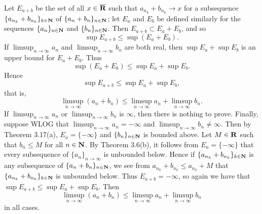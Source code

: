 \begin{ex}
Let $E_{a+b}$ be the set of all $x \in \overline{\mathbf{R}}$ such that $a_{n_k} + b_{n_k} \to x$ for a subsequence $\{a_{n_k} + b_{n_k}\}_{k \in \mathbf{N}}$ of $\{a_n + b_n\}_{n \in \mathbf{N}}$; let $E_a$ and $E_b$ be defined similarly for the sequences $\{a_n\}_{n \in \mathbf{N}}$ and $\{b_n\}_{n \in \mathbf{N}}$. Then $E_{a+b} \subset E_a + E_b$, and so \[\sup E_{a + b} \leq \sup(E_a + E_b).\] If $\limsup_{n\to\infty}a_n$ and $\limsup_{n\to\infty}b_n$ are both real, then $\sup E_a + \sup E_b$ is an upper bound for $E_a + E_b$. Thus\[\sup(E_a + E_b) \leq \sup E_a + \sup E_b.\] Hence \[\sup E_{a+b} \leq \sup E_a + \sup E_b,\] that is, \[\limsup_{n\to\infty}(a_n+b_n) \leq \limsup_{n\to\infty}a_n + \limsup_{n\to\infty}b_n.\] If $\limsup_{n\to\infty}a_n$ or $\limsup_{n\to\infty}b_n$ is $\infty$, then there is nothing to prove. Finally, suppose WLOG that $\limsup_{n\to\infty}a_n = -\infty$ and $\limsup_{n\to\infty}b_n \not = \infty$. Then by Theorem 3.17(a), $E_a = \{-\infty\}$ and $\{b_n\}_{n \in \mathbf{N}}$ is bounded above. Let $M \in \mathbf{R}$ such that $b_n \leq M$ for all $n \in \mathbf{N}$. By Theorem 3.6(b), it follows from $E_a = \{-\infty\}$ that every subsequence of $\{a_n\}_{n\to\infty}$ is unbounded below. Hence if $\{a_{n_k}+b_{n_k}\}_{k \in \mathbf{N}}$ is any subsequence of $\{a_n+b_n\}_{n \in \mathbf{N}}$, we see from $a_{n_k}+b_{n_k} \leq a_{n_k} + M$ that $\{a_{n_k}+b_{n_k}\}_{k \in \mathbf{N}}$ is unbounded below. Thus $E_{a+b} = -\infty$, so again we have that $\sup E_{a+b} \leq \sup E_a+\sup E_b$. Then \[\limsup_{n\to\infty}(a_n + b_n) \leq \limsup_{n\to\infty}a_n + \limsup_{n\to\infty}b_n\] in all cases.
\end{ex}

